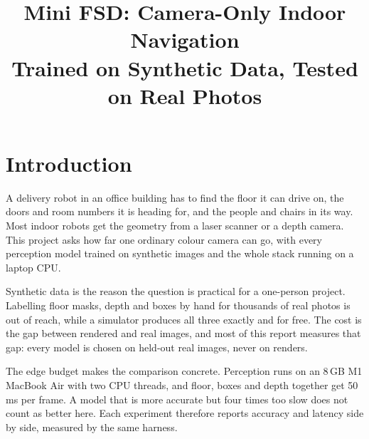 \documentclass[conference]{IEEEtran}
\begin{document}
\title{Mini FSD: Camera-Only Indoor Navigation\\
Trained on Synthetic Data, Tested on Real Photos}

\author{
}

\maketitle

\begin{abstract}
\end{abstract}

\section{Introduction}

A delivery robot in an office building has to find the floor it can drive
on, the doors and room numbers it is heading for, and the people and chairs
in its way. Most indoor robots get the geometry from a laser scanner or a
depth camera. This project asks how far one ordinary colour camera can go,
with every perception model trained on synthetic images and the whole
stack running on a laptop CPU.

Synthetic data is the reason the question is practical for a one-person
project. Labelling floor masks, depth and boxes by hand for thousands of
real photos is out of reach, while a simulator produces all three exactly
and for free. The cost is the gap between rendered and real images, and
most of this report measures that gap: every model is chosen on held-out
real images, never on renders.

The edge budget makes the comparison concrete. Perception runs on an 8\,GB
M1 MacBook Air with two CPU threads, and floor, boxes and depth together
get 50\,ms per frame. A model that is more accurate but four times too slow
does not count as better here. Each experiment therefore reports accuracy
and latency side by side, measured by the same harness.
\end{document}
